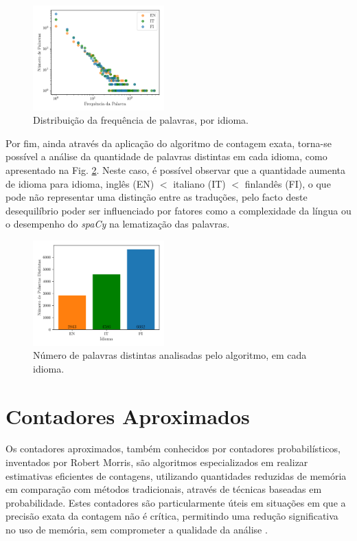 \documentclass[mirror, portugues]{revdetua}
\begin{document}
\begin{figure}[H]
    \centering
    \includegraphics[width=0.45\textwidth]{../assets/exact_word_freqs.png}
    \caption{Distribuição da frequência de palavras, por idioma.}
    \label{fig:word_freqs}
\end{figure}

Por fim, ainda através da aplicação do algoritmo de contagem exata, torna-se possível a análise da quantidade de palavras distintas em cada idioma, como apresentado na Fig. \ref{fig:distinc_words}. Neste caso, é possível observar que a quantidade aumenta de idioma para idioma, inglês (EN) $<$ italiano (IT) $<$ finlandês (FI), o que pode não representar uma distinção entre as traduções, pelo facto deste desequilíbrio poder ser influenciado por fatores como a complexidade da língua ou o desempenho do \textit{spaCy} na lematização das palavras.

\begin{figure}[H]
    \centering
    \includegraphics[width=0.45\textwidth]{../assets/exact_distinct_words.png}
    \caption{Número de palavras distintas analisadas pelo algoritmo, em cada idioma.}
    \label{fig:distinc_words}
\end{figure}



\section{Contadores Aproximados}

Os contadores aproximados, também conhecidos por contadores probabilísticos, inventados por Robert Morris, são algoritmos especializados em realizar estimativas eficientes de contagens, utilizando quantidades reduzidas de memória em comparação com métodos tradicionais, através de técnicas baseadas em probabilidade. Estes contadores são particularmente úteis em situações em que a precisão exata da contagem não é crítica, permitindo uma redução significativa no uso de memória, sem comprometer a qualidade da análise \cite{RM78}.
\end{document}
